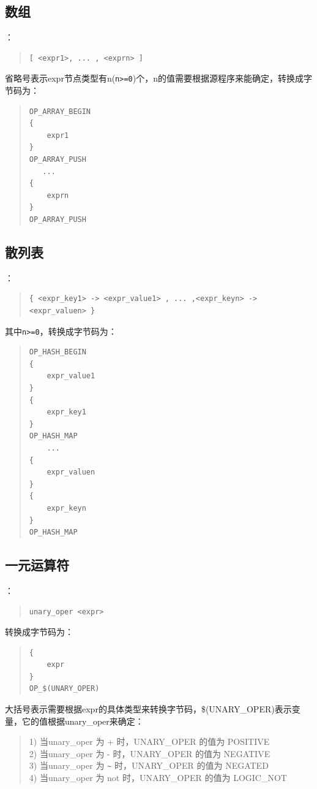 \subsection{数组}
：
\begin{quote}
\begin{verbatim}
[ <expr1>, ... , <exprn> ]
\end{verbatim}
\end{quote}
省略号表示expr节点类型有n(\verb|n>=0|)个，n的值需要根据源程序来能确定，转换成字节码为：
\begin{quote}
\begin{verbatim}
OP_ARRAY_BEGIN
{
    expr1
}
OP_ARRAY_PUSH
   ...
{
    exprn
}
OP_ARRAY_PUSH
\end{verbatim}
\end{quote}

\subsection{散列表}
：
\begin{quote}
\begin{verbatim}
{ <expr_key1> -> <expr_value1> , ... ,<expr_keyn> -> <expr_valuen> } 
\end{verbatim}
\end{quote}
其中\verb|n>=0|，转换成字节码为：
\begin{quote}
\begin{verbatim}
OP_HASH_BEGIN
{
    expr_value1
}
{
    expr_key1
}
OP_HASH_MAP
    ...
{
    expr_valuen
}
{
    expr_keyn
}
OP_HASH_MAP
\end{verbatim}
\end{quote}




\subsection{一元运算符}
：
\begin{quote}
\begin{verbatim}
unary_oper <expr>
\end{verbatim}
\end{quote}
转换成字节码为：
\begin{quote}
\begin{verbatim}
{
    expr
}
OP_$(UNARY_OPER)
\end{verbatim}
\end{quote}
大括号表示需要根据expr的具体类型来转换字节码，\$(UNARY\_OPER)表示变量，它的值根据unary\_oper来确定：
\begin{quote}
1) 当unary\_oper 为 + 时，UNARY\_OPER 的值为 POSITIVE \\
2) 当unary\_oper 为 - 时，UNARY\_OPER 的值为 NEGATIVE \\
3) 当unary\_oper 为 \verb|~| 时，UNARY\_OPER 的值为 NEGATED \\
4) 当unary\_oper 为 not 时，UNARY\_OPER 的值为 LOGIC\_NOT
\end{quote}

